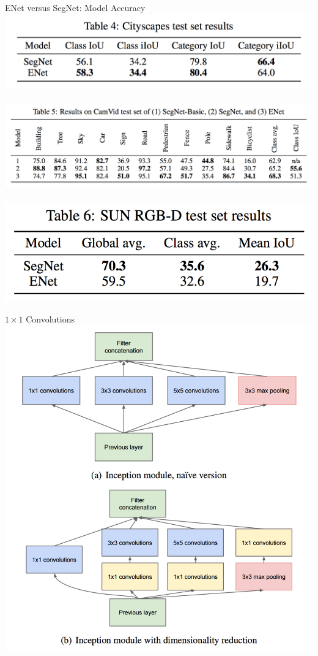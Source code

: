 \documentclass[]{beamer}
\begin{document}
\begin{frame}{ENet versus SegNet: Model Accuracy}
\centering
\includegraphics[scale=0.325]{figures/enet-versus-segnet-accuracy-1-cityscapes} \\
\hspace*{\fill} \\
\includegraphics[scale=0.325]{figures/enet-versus-segnet-accuracy-2-camvid} \\
\hspace*{\fill} \\
\includegraphics[scale=0.325]{figures/enet-versus-segnet-accuracy-3-sun-rgbd} \\
\end{frame}

\begin{frame}{$1 \times 1$ Convolutions}
\centering
\includegraphics[scale=0.375]{figures/1x1-convolutions}
\end{frame}
\end{document}
